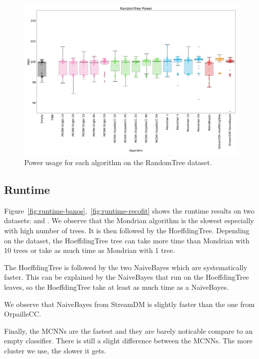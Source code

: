 \begin{figure}[H]
	\includegraphics[width=\linewidth]{figures/results/dataset_3_watt.png}
	\caption{Power usage for each algorithm on the RandomTree dataset.}
	\label{fig:power-dataset_3}
\end{figure}

\subsection{Runtime}
Figure~\ref{fig:runtime-banos},~\ref{fig:runtime-recofit} shows the runtime results on two datasets:
\banosdataset and \recofitdataset. We observe that the Mondrian algorithm is
the slowest especially with high number of trees.
It is then followed by the HoeffdingTree. Depending on the dataset, the
HoeffdingTree tree can take more time than Mondrian with 10 trees or take as
much time as Mondrian with 1 tree.

The HoeffdingTree is followed by the two NaiveBayes which are systematically
faster.  This can be explained by the NaiveBayes that run on the HoeffdingTree
leaves, so the HoeffdingTree take at least as much time as a NaiveBayes.

We observe that NaiveBayes from StreamDM is slightly faster than the one from
OrpailleCC.

Finally, the MCNNs are the fastest and they are barely noticable compare to an
empty classifier. There is still a slight difference between the MCNNs. The
more cluster we use, the slower it gets.


